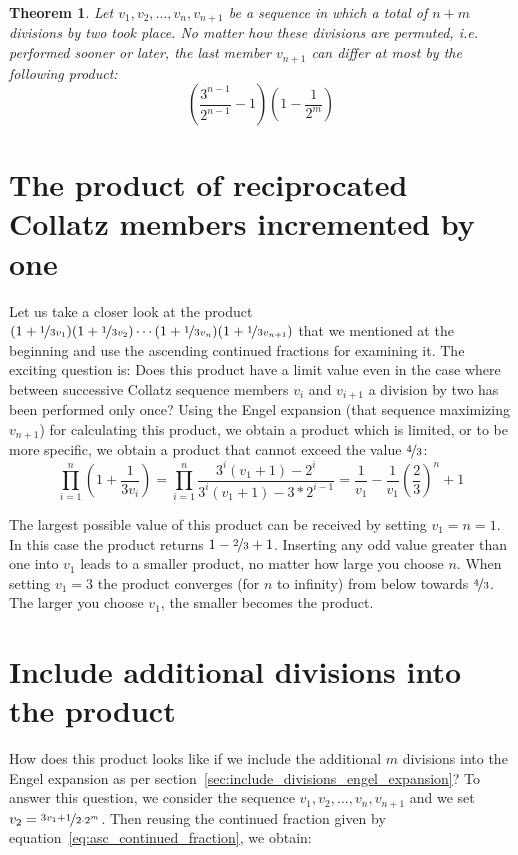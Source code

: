 \documentclass[12pt]{amsart}
\newtheorem{theorem}{Theorem}[section]
\theoremstyle{definition}
\begin{document}
\par\medskip
\begin{theorem}
	\label{theo:permutation}
	Let $v_1,v_2,\ldots,v_n,v_{n+1}$ be a sequence in which a total of $n+m$ divisions by two took place. No matter how these divisions are permuted, i.e. performed sooner or later, the last member $v_{n+1}$ can differ at most by the following product:
	\[
	\left(\frac{3^{n-1}}{2^{n-1}}-1\right)\left(1-\frac{1}{2^m}\right)
	\]
\end{theorem}

\section{The product of reciprocated Collatz members incremented by one}
Let us take a closer look at the product $(1+\nicefrac{1}{3v_1})(1+\nicefrac{1}{3v_2})\cdots(1+\nicefrac{1}{3v_n})(1+\nicefrac{1}{3v_{n+1}})$ that we mentioned at the beginning and use the ascending continued fractions for examining it. The exciting question is: Does this product have a limit value even in the case where between successive Collatz sequence members $v_i$ and $v_{i+1}$ a division by two has been performed only once? Using the Engel expansion (that sequence maximizing $v_{n+1}$) for calculating this product, we obtain a product which is limited, or to be more specific, we obtain a product that cannot exceed the value $\nicefrac{4}{3}$:
\begin{equation}
\label{eq:product_simplification_k3}
\prod_{i=1}^{n}\left(1+\frac{1}{3v_{i}}\right)
=\prod_{i=1}^{n}\frac{3^i(v_1+1)-2^i}{3^i(v_1+1)-3*2^{i-1}}
=\frac{1}{v_1}-\frac{1}{v_1}\left(\frac{2}{3}\right)^n+1
\end{equation}

The largest possible value of this product can be received by setting $v_1=n=1$. In this case the product returns $1-\nicefrac{2}{3}+1$. Inserting any odd value greater than one into $v_1$ leads to a smaller product, no matter how large you choose $n$. When setting $v_1=3$ the product converges (for $n$ to infinity) from below towards $\nicefrac{4}{3}$. The larger you choose $v_1$, the smaller becomes the product.

\section{Include additional divisions into the product}
How does this product looks like if we include the additional $m$ divisions into the Engel expansion as per section~\ref{sec:include_divisions_engel_expansion}? To answer this question, we consider the sequence $v_1,v_2,\ldots,v_n,v_{n+1}$ and we set $v_2=\nicefrac{3v_1+1}{2\cdot2^{m}}$. Then reusing the continued fraction given by equation~\ref{eq:asc_continued_fraction}, we obtain:
\end{document}
